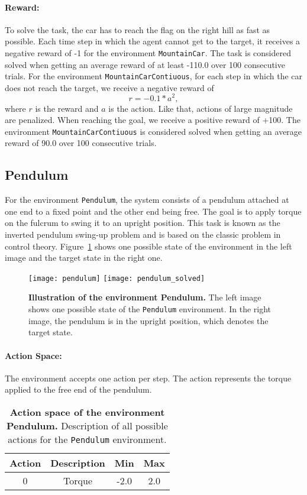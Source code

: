 \paragraph*{Reward:} To solve the task, the car has to reach the flag on the right hill as fast as possible. Each time step in which the agent cannot get to the target, it receives a negative reward of -1 for the environment \verb|MountainCar|. The task is considered solved when getting an average reward of at least -110.0 over 100 consecutive trials. For the environment \verb|MountainCarContiuous|, for each step in which the car does not reach the target, we receive a negative reward of
\[
  r = -0.1 * a^2,
\]
where $r$ is the reward and $a$ is the action. Like that, actions of large magnitude are penalized. When reaching the goal, we receive a positive reward of +100. The environment \texttt{MountainCarContiuous} is considered solved when getting an average reward of 90.0 over 100 consecutive trials.

\subsection{Pendulum}
For the environment \verb|Pendulum|, the system consists of a pendulum attached at one end to a fixed point and the other end being free. The goal is to apply torque on the fulcrum to swing it to an upright position. This task is known as the inverted pendulum swing-up problem and is based on the classic problem in control theory. Figure~\ref{fig:pendulum} shows one possible state of the environment in the left image and the target state in the right one.
 \begin{figure}[!ht]
  \centering
\texttt{[image: pendulum]} \hspace*{10mm}
\texttt{[image: pendulum\_solved]}
\caption[Illustration of the environment Pendulum]{
  \textbf{Illustration of the environment Pendulum.}
  The left image shows one possible state of the \texttt{Pendulum} environment. In the right image, the pendulum is in the upright position, which denotes the target state.
}
\label{fig:pendulum}
\end{figure}

\paragraph*{Action Space:} The environment accepts one action per step. The action represents the torque applied to the free end of the pendulum.
\begin{table}[!ht]
  \centering
  \begin{tabular}{ |c|c|c|c| }
    \hline
    Action & Description & Min & Max \\
    \hline
    0 & Torque & -2.0 & 2.0 \\
    \hline
  \end{tabular}
  \caption[Action space of the environment Pendulum]{
    \textbf{Action space of the environment Pendulum.}
    Description of all possible actions for the \texttt{Pendulum} environment.
  }
  \label{table:pendulum_act}
\end{table}


